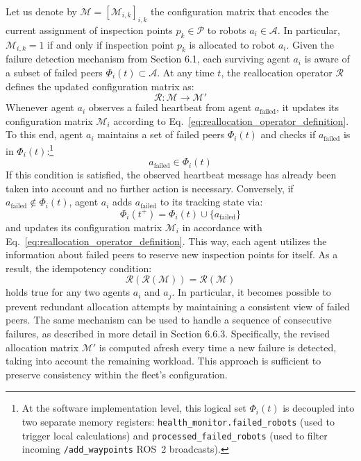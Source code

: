 Let us denote by $\mathcal{M} = [\mathcal{M}_{i,k}]_{i,k}$ the configuration matrix that encodes the current assignment of inspection points $p_k \in \mathcal{P}$ to robots $a_i \in \mathcal{A}$. In particular, $\mathcal{M}_{i,k} = 1$ if and only if inspection point $p_k$ is allocated to robot $a_i$. Given the failure detection mechanism from Section 6.1, each surviving agent $a_i$ is aware of a subset of failed peers $\Phi_i(t) \subset \mathcal{A}$. At any time $t$, the reallocation operator $\mathcal{R}$ defines the updated configuration matrix as:
\begin{equation} \mathcal{R}: \mathcal{M} \to \mathcal{M}' \label{eq:reallocation_operator_definition} \end{equation}
Whenever agent $a_i$ observes a failed heartbeat from agent $a_{\text{failed}}$, it updates its configuration matrix $\mathcal{M}_i$ according to Eq.~\ref{eq:reallocation_operator_definition}. To this end, agent $a_i$ maintains a set of failed peers $\Phi_i(t)$ and checks if $a_{\text{failed}}$ is in $\Phi_i(t)$:\footnote{At the software implementation level, this logical set $\Phi_i(t)$ is decoupled into two separate memory registers: \texttt{health\_\allowbreak monitor.\allowbreak failed\_\allowbreak robots} (used to trigger local calculations) and \texttt{processed\_\allowbreak failed\_\allowbreak robots} (used to filter incoming \texttt{/add\_waypoints} ROS~2 broadcasts).}
\begin{equation} a_{\text{failed}} \in \Phi_i(t) \label{eq:processed_set_check} \end{equation}
If this condition is satisfied, the observed heartbeat message has already been taken into account and no further action is necessary. Conversely, if $a_{\text{failed}} \notin \Phi_i(t)$, agent $a_i$ adds $a_{\text{failed}}$ to its tracking state via:
\begin{equation} \Phi_i(t^+) = \Phi_i(t) \cup \{ a_{\text{failed}} \} \label{eq:processed_set_update} \end{equation}
and updates its configuration matrix $\mathcal{M}_i$ in accordance with Eq.~\ref{eq:reallocation_operator_definition}. This way, each agent utilizes the information about failed peers to reserve new inspection points for itself. As a result, the idempotency condition:
\begin{equation} \mathcal{R} \left( \mathcal{R} \left( \mathcal{M} \right) \right) = \mathcal{R}\left( \mathcal{M} \right) \label{eq:idempotency_proof} \end{equation}
holds true for any two agents $a_i$ and $a_j$. In particular, it becomes possible to prevent redundant allocation attempts by maintaining a consistent view of failed peers. The same mechanism can be used to handle a sequence of consecutive failures, as described in more detail in Section 6.6.3. Specifically, the revised allocation matrix $\mathcal{M}'$ is computed afresh every time a new failure is detected, taking into account the remaining workload. This approach is sufficient to preserve consistency within the fleet's configuration.

